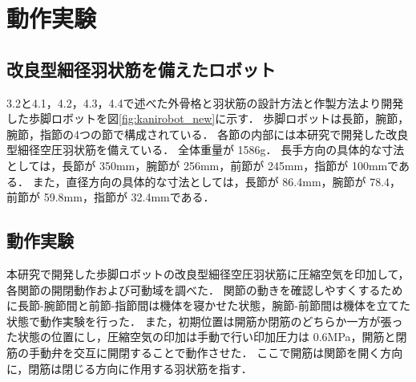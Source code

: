 \newpage
\section{動作実験}
\subsection{改良型細径羽状筋を備えたロボット}
3.2と4.1，4.2，4.3，4.4で述べた外骨格と羽状筋の設計方法と作製方法より開発した歩脚ロボットを図\ref{fig:kanirobot_new}に示す．
歩脚ロボットは長節，腕節，腕節，指節の4つの節で構成されている．
各節の内部には本研究で開発した改良型細径空圧羽状筋を備えている．
全体重量が 1586g．
長手方向の具体的な寸法としては，長節が 350mm，腕節が 256mm，前節が 245mm，指節が 100mmである．
また，直径方向の具体的な寸法としては，長節が 86.4mm，腕節が 78.4，前節が 59.8mm，指節が 32.4mmである．
\subsection{動作実験}
本研究で開発した歩脚ロボットの改良型細径空圧羽状筋に圧縮空気を印加して，各関節の開閉動作および可動域を調べた．
関節の動きを確認しやすくするために長節-腕節間と前節-指節間は機体を寝かせた状態，腕節-前節間は機体を立てた状態で動作実験を行った．
また，初期位置は開筋か閉筋のどちらか一方が張った状態の位置にし，圧縮空気の印加は手動で行い印加圧力は 0.6MPa，開筋と閉筋の手動弁を交互に開閉することで動作させた．
ここで開筋は関節を開く方向に，閉筋は閉じる方向に作用する羽状筋を指す．

